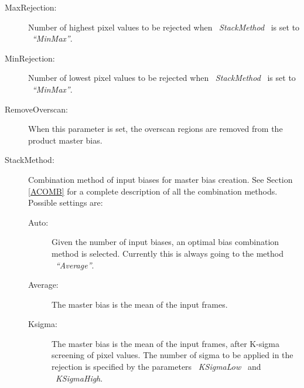 \begin{description}
\item [MaxRejection:]  Number of highest pixel values to be rejected 
                       when \ {\it StackMethod} \ is set to \ {\it ``MinMax''}.

\item [MinRejection:]  Number of lowest pixel values to be rejected 
                       when \ {\it StackMethod} \ is set to \ {\it ``MinMax''}.
%                          

\item [RemoveOverscan:] When this parameter is set, the overscan regions are
                        removed from the product master bias.

\item [StackMethod:]  Combination method of input biases for master bias 
                      creation. See Section \ref{ACOMB} for a complete 
                      description of all the combination methods. Possible 
                      settings are:

\begin{description}

  \item [Auto:]     Given the number of input biases, an optimal bias
                    combination method is selected. Currently this is
                    always going to the method \ {\it ``Average''}.

  \item [Average:]  The master bias is the mean of the input frames.

  \item [Ksigma:]   The master bias is the mean of the input frames, after
                    K-sigma screening of pixel values. The number of sigma 
                    to be applied in the rejection is specified by the 
                    parameters \ {\it KSigmaLow} \ and \ {\it KSigmaHigh}.


\end{description}
\end{description}

